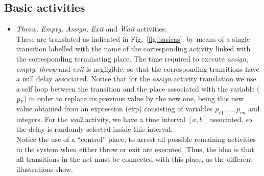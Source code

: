 

\subsection{Basic activities}
\begin{itemize}
\item {\it Throw, Empty, Assign, Exit} and  {\it Wait} activities:\\
%
These are translated as indicated in \mbox{Fig.\ \ref{fig:basicas}},
by means of a single transition labelled
with the name of the corresponding activity linked with the corresponding terminating place. 
The time required  to execute 
{\it assign}, {\it empty}, {\it throw} and {\it exit} is negligible, so that the 
corresponding transitions have a null delay associated.
Notice that for the {\em assign} activity translation we use
a self loop between the transition and the
place associated with the variable ($p_{\it v}$)
in order to replace its previous value by the new one, being this new value obtained from an expression (exp) consisting of variables $p_{v1},\ldots,p_{vn}$ and integers. For the {\it wait}
activity, we have a time interval $[a,b]$ associated, so the delay is randomly selected
inside this interval.\\
Notice the use of a ``control'' place, to arrest all possible remaining activities in the system when either throw or exit are executed. Thus, the idea is that all transitions in the net must be connected with this place, as the different illustrations show.
\vspace{-1.3cm}


\end{itemize}
